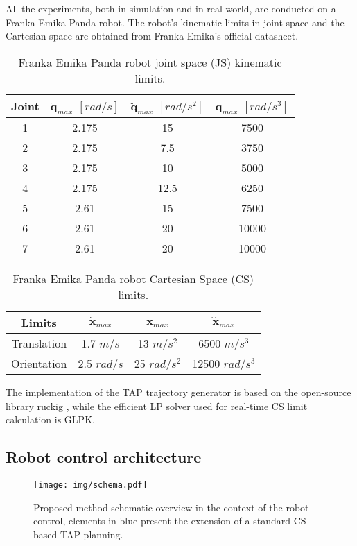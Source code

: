 All the experiments, both in simulation and in real world, are conducted on a Franka Emika Panda robot. The robot's kinematic limits in joint space and the Cartesian space are obtained from Franka Emika's official datasheet\cite{frankadata}.

\begin{table}[h!]
    \centering
 \caption{Franka Emika Panda robot joint space (JS) kinematic limits.}
    \begin{tabular}{c|ccc}
Joint & $\dot{\bm{q}}_{max}$ $[{rad}/{s}]$ & $\ddot{\bm{q}}_{max}$  $[{rad}/{s^2}]$ & $\dddot{\bm{q}}_{max}$   $[{rad}/{s^3}]$
\vspace{0.05cm}\\
\hline
 1 & 2.175 & 15 & 7500 \\
 2 & 2.175 & 7.5 & 3750 \\
 3 & 2.175 & 10 & 5000 \\
 4 & 2.175 & 12.5 & 6250 \\
 5 & 2.61 & 15 & 7500 \\
 6 & 2.61 & 20 & 10000 \\
 7 & 2.61 & 20 & 10000\\
\end{tabular}
    \label{tab:panda_limits_js}
\end{table}

\begin{table}[h]
\caption{Franka Emika Panda robot Cartesian Space (CS) limits.}
\label{table:franka_limits}
\centering
\begin{tabular}{c|ccc}
Limits & $\dot{\bm{x}}_{max}$ & $\ddot{\bm{x}}_{max}$ & $\dddot{\bm{x}}_{max}$ \\
\hline
Translation & 1.7 $m/s$ & 13 $m/s^2$  & 6500 $m/s^3$\\
Orientation & 2.5 $rad/s$ & 25 $rad/s^{2}$  & 12500 $rad/s^{3}$\\
\end{tabular}
\end{table}


The implementation of the TAP trajectory generator is based on the open-source library ruckig \cite{ruckig}, while the efficient LP solver used for real-time CS limit calculation is GLPK\cite{glpk}.

\subsection{Robot control architecture}
\label{ch:qp}

\begin{figure}[!tb]
    \centering
    \texttt{[image: img/schema.pdf]}
    \caption{Proposed method schematic overview in the context of the robot control, elements in blue present the extension of a standard CS based TAP planning.}
    \label{fig:schema}
\end{figure}


